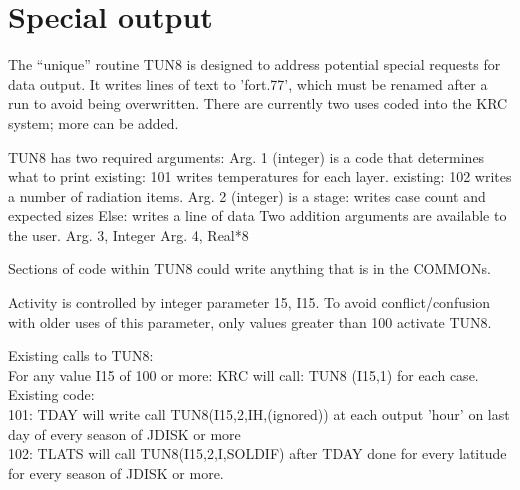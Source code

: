 \documentclass{article}
\begin{document}
\section{Special output \label{tun}}
The ``unique'' routine TUN8 is designed to address potential special requests
for data output. It writes lines of text to 'fort.77', which must be renamed
after a run to avoid being overwritten. There are currently two uses coded into
the KRC system; more can be added. 

TUN8 has two required arguments:
\qi Arg. 1 (integer) is a code that determines what to print  
\qii existing: 101 writes temperatures for each layer.
\qii existing: 102 writes a number of radiation items. 
\qi Arg. 2 (integer) is a stage:
 writes case count and expected sizes 
\qii Else: writes a line of data
\qi Two addition arguments are available to the user.
\qii Arg. 3, Integer
\qii Arg. 4, Real*8

Sections of code within TUN8 could write anything that is in the COMMONs.

Activity is controlled by integer parameter 15, I15. To avoid conflict/confusion 
with older uses of this parameter, only values greater than 100 activate TUN8.

Existing calls to TUN8:
\\ For any value I15 of 100 or more: KRC will call: TUN8 (I15,1) for each case. Existing code:
\\ 101: TDAY will write call TUN8(I15,2,IH,(ignored)) at each output 'hour' on last day of every season of JDISK or more 
\\ 102: TLATS will call TUN8(I15,2,I,SOLDIF) after TDAY done for every latitude for every season of JDISK or more.    
\end{document}
